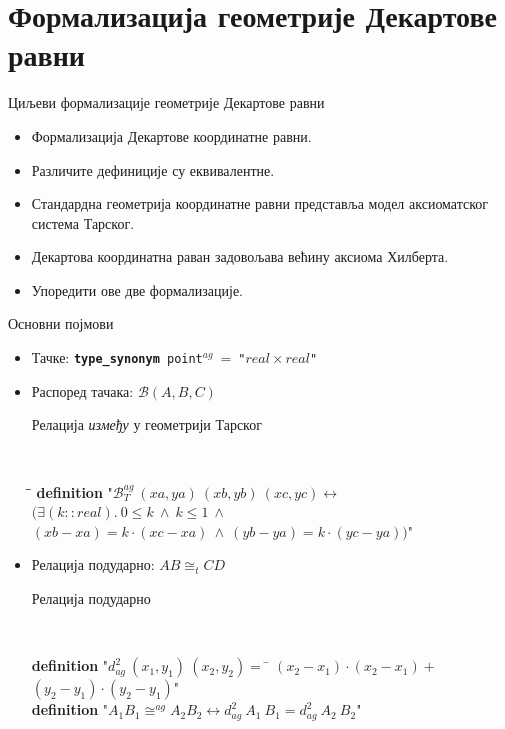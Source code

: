 \documentclass[slidestop, compress, mathserif, containsverbatim, xcolor=dvipsnames]{beamer}
\newcommand{\agbett}[3]{\ensuremath{\mathcal{B}_T^{\mathit{ag}}\ #1\ #2\ #3}}
\newcommand{\agcongr}[4]{\ensuremath{#1#2 \cong^{ag} #3#4}}
\newcommand{\agsqdist}[2]{\ensuremath{d^2_{ag}\ #1\ #2}}
\newcommand{\congrt}[4]{\ensuremath{#1#2 \cong_t #3#4}}
\begin{document}
\section{Формализација геометрије Декартове равни}

\begin{frame}{Циљеви формализације геометрије Декартове равни}
  \begin{itemize}
  \item Формализација Декартове координатне равни. \vfill
  \item Различите дефиниције су еквивалентне. \vfill
  \item Стандардна геометрија координатне равни представља модел
    аксиоматског система Тарског. \vfill
  \item Декартова координатна раван задовољава већину аксиома Хилберта. \vfill
  \item Упоредити ове две формализације. \vfill
  \end{itemize}
\end{frame}

\begin{frame}{Основни појмови}
  \begin{itemize}
  \item Тачке: {\tt {\bf type\_synonym}\ point$^{ag}\ =\ $"$real \times real$"\ }
  \item Распоред тачака: $\mathcal{B}(A, B, C)$
    \begin{block}{Релација \emph{између} у геометрији Тарског}
      {\tt
        \begin{tabbing}
          \hspace{5mm}\=\hspace{5mm}\=\kill
          {\bf definition} "$\agbett{(xa, ya)}{(xb, yb)}{(xc, yc)} \longleftrightarrow$\\
      \>$(\exists (k::real).\ 0 \le k \ \wedge\ k \le 1 \ \wedge$\\
      \>\>$(xb - xa) = k \cdot (xc - xa) \ \wedge\ (yb - ya) = k \cdot (yc - ya))$"
        \end{tabbing}
      }
    \end{block}
  \item Релација подударно: $\congrt{A}{B}{C}{D}$
    \begin{block}{Релација подударно}
      {\tt
        \begin{tabbing}
          {\bf definition} "$\agsqdist{(x_1, y_1)}{(x_2, y_2)} =$ \= $(x_2-x_1)\cdot (x_2-x_1)+$ \\
           \> $(y_2-y_1)\cdot (y_2-y_1)$"\\
          {\bf definition} "$\agcongr{A_1}{B_1}{A_2}{B_2} \longleftrightarrow \agsqdist{A_1}{B_1} = \agsqdist{A_2}{B_2}$"
        \end{tabbing}
      }
    \end{block}
  \end{itemize}
\end{frame}
\end{document}
